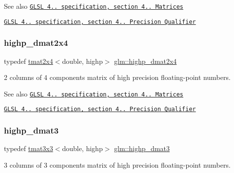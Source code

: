 \begin{DoxySeeAlso}{See also}
\href{http://www.opengl.org/registry/doc/GLSLangSpec.4.20.8.pdf}{\tt G\+L\+SL 4.. specification, section 4.. Matrices} 

\href{http://www.opengl.org/registry/doc/GLSLangSpec.4.20.8.pdf}{\tt G\+L\+SL 4.. specification, section 4.. Precision Qualifier} 
\end{DoxySeeAlso}
\mbox{\label{group__core__precision_ga2b1bf87a8f8fbc895127c6bfde7a271e}} 
\subsubsection{\texorpdfstring{highp\+\_\+dmat2x4}{highp\_dmat2x4}}
{\footnotesize\ttfamily typedef \hyperlink{structglm_1_1tmat2x4}{tmat2x4}$<$double, highp$>$ \hyperlink{group__core__precision_ga2b1bf87a8f8fbc895127c6bfde7a271e}{glm\+::highp\+\_\+dmat2x4}}

2 columns of 4 components matrix of high precision floating-\/point numbers.

\begin{DoxySeeAlso}{See also}
\href{http://www.opengl.org/registry/doc/GLSLangSpec.4.20.8.pdf}{\tt G\+L\+SL 4.. specification, section 4.. Matrices} 

\href{http://www.opengl.org/registry/doc/GLSLangSpec.4.20.8.pdf}{\tt G\+L\+SL 4.. specification, section 4.. Precision Qualifier} 
\end{DoxySeeAlso}
\mbox{\label{group__core__precision_gafa89ae412491446e508782ddd9bc55c7}} 
\subsubsection{\texorpdfstring{highp\+\_\+dmat3}{highp\_dmat3}}
{\footnotesize\ttfamily typedef \hyperlink{structglm_1_1tmat3x3}{tmat3x3}$<$double, highp$>$ \hyperlink{group__core__precision_gafa89ae412491446e508782ddd9bc55c7}{glm\+::highp\+\_\+dmat3}}

3 columns of 3 components matrix of high precision floating-\/point numbers.

